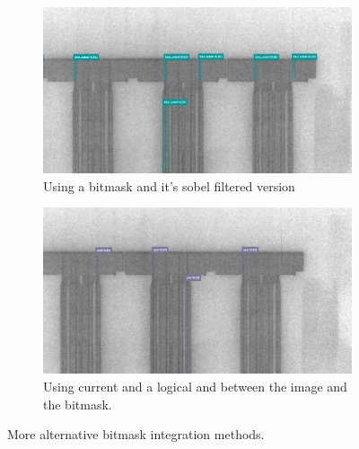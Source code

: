\begin{figure}[!h]
\centering

  \begin{subfigure}{.9\textwidth}
    \centering
    \includegraphics[width=\linewidth]{images/implementation/results/bm/bm_sobel}
    \caption{Using a bitmask and it's sobel filtered version}
  \end{subfigure}

  \begin{subfigure}{.9\textwidth}
    \centering
    \includegraphics[width=\linewidth]{images/implementation/results/bm/and}
    \caption{Using current and a logical and between the image and the bitmask.}
  \end{subfigure}

  \caption{More alternative bitmask integration methods.}
  \label{app:bm_compare_ext}
\end{figure}
